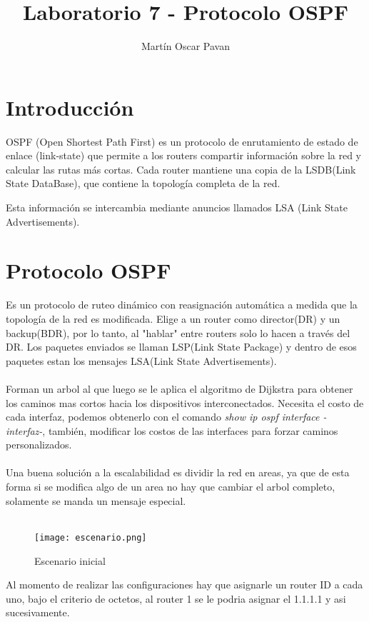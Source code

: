 \documentclass{article}
\title{Laboratorio 7 - Protocolo OSPF}
\author{Martín Oscar Pavan}
\begin{document}
\maketitle
\section{Introducción}

OSPF (Open Shortest Path First) es un protocolo de enrutamiento de estado de enlace (link-state) que permite a los routers compartir información sobre la red y calcular las rutas más cortas. Cada router mantiene una copia de la LSDB(Link State DataBase), que contiene la topología completa de la red.

Esta información se intercambia mediante anuncios llamados LSA (Link State Advertisements).

\section{Protocolo OSPF}
Es un protocolo de ruteo dinámico con reasignación automática a medida que la topología de la red es modificada. Elige a un router como director(DR) y un backup(BDR), por lo tanto, al "hablar" entre routers solo lo hacen a través del DR. Los paquetes enviados se llaman LSP(Link State Package) y dentro de esos paquetes estan los mensajes LSA(Link State Advertisements).
\\\\
Forman un arbol al que luego se le aplica el algoritmo de Dijkstra para obtener los caminos mas cortos hacia los dispositivos interconectados. Necesita el costo de cada interfaz, podemos obtenerlo con el comando \textit{show ip ospf interface -interfaz-}, también, modificar los costos de las interfaces para forzar caminos personalizados.
\\\\
Una buena solución a la escalabilidad es dividir la red en areas, ya que de esta forma si se modifica algo de un area no hay que cambiar el arbol completo, solamente se manda un mensaje especial.
\\\\
\begin{figure}[H]
    \centering
    \texttt{[image: escenario.png]}
    \caption{Escenario inicial}
    \label{fig:enter-label}
\end{figure}
Al momento de realizar las configuraciones hay que asignarle un router ID a cada uno, bajo el criterio de octetos, al router 1 se le podria asignar el 1.1.1.1 y asi sucesivamente.
\end{document}
